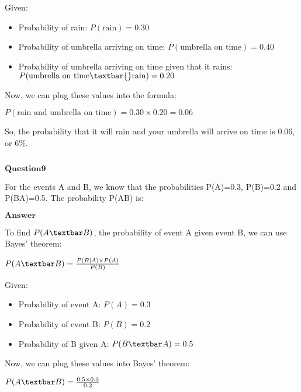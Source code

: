\documentclass[11pt]{article}
\makeatletter
\providecommand{\tightlist}{%
      \setlength{\itemsep}{0pt}\setlength{\parskip}{0pt}}
\newcommand{\boxspacing}{\kern\kvtcb@left@rule\kern\kvtcb@boxsep}
\newcommand{\prompt}[4]{
        {\ttfamily\llap{{\color{#2}[#3]:\hspace{3pt}#4}}\vspace{-\baselineskip}}
    }
\makeatother
\begin{document}
Given:

\begin{itemize}
\tightlist
\item
  Probability of rain: $ P(\text{rain}) = 0.30 $
\item
  Probability of umbrella arriving on time: $
  P(\text{umbrella on time}) = 0.40 $
\item
  Probability of umbrella arriving on time given that it rains: $
  P(\text{umbrella on time}\textbar{}\text{rain}) = 0.20 $
\end{itemize}

Now, we can plug these values into the formula:

$ P(\text{rain and umbrella on time}) = 0.30 \times 0.20 = 0.06 $

So, the probability that it will rain and your umbrella will arrive on
time is $ 0.06 $, or 6\%.

    \begin{tcolorbox}[breakable, size=fbox, boxrule=1pt, pad at break*=1mm,colback=cellbackground, colframe=cellborder]
\prompt{In}{incolor}{ }{\boxspacing}
\begin{Verbatim}[commandchars=\\\{\}]

\end{Verbatim}
\end{tcolorbox}

    $\textbf{Question9}$

For the events A and B, we know that the probabilities P(A)=0.3,
P(B)=0.2 and P(B\textbar A)=0.5. The probability P(A\textbar B) is:

$\textbf{Answer}$

    To find $ P(A\textbar B) $, the probability of event A given event B,
we can use Bayes' theorem:

$ P(A\textbar B) = \frac{P(B|A) \times P(A)}{P(B)} $

Given:

\begin{itemize}
\tightlist
\item
  Probability of event A: $ P(A) = 0.3 $
\item
  Probability of event B: $ P(B) = 0.2 $
\item
  Probability of B given A: $ P(B\textbar A) = 0.5 $
\end{itemize}

Now, we can plug these values into Bayes' theorem:

$ P(A\textbar B) = \frac{0.5 \times 0.3}{0.2} $
\end{document}
